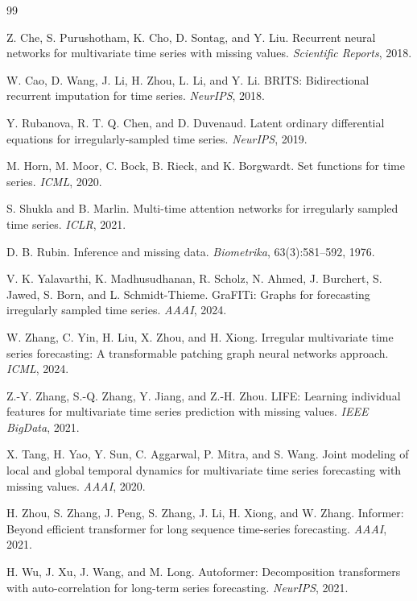 ﻿\documentclass[10pt,conference]{IEEEtran}
\begin{document}
\begin{thebibliography}{99}

Z. Che, S. Purushotham, K. Cho, D. Sontag, and Y. Liu.
Recurrent neural networks for multivariate time series with missing values.
\emph{Scientific Reports}, 2018.

W. Cao, D. Wang, J. Li, H. Zhou, L. Li, and Y. Li.
BRITS: Bidirectional recurrent imputation for time series.
\emph{NeurIPS}, 2018.

Y. Rubanova, R. T. Q. Chen, and D. Duvenaud.
Latent ordinary differential equations for irregularly-sampled time series.
\emph{NeurIPS}, 2019.

M. Horn, M. Moor, C. Bock, B. Rieck, and K. Borgwardt.
Set functions for time series.
\emph{ICML}, 2020.

S. Shukla and B. Marlin.
Multi-time attention networks for irregularly sampled time series.
\emph{ICLR}, 2021.

D. B. Rubin.
Inference and missing data.
\emph{Biometrika}, 63(3):581--592, 1976.

V. K. Yalavarthi, K. Madhusudhanan, R. Scholz, N. Ahmed, J. Burchert,
S. Jawed, S. Born, and L. Schmidt-Thieme.
GraFITi: Graphs for forecasting irregularly sampled time series.
\emph{AAAI}, 2024.

W. Zhang, C. Yin, H. Liu, X. Zhou, and H. Xiong.
Irregular multivariate time series forecasting: A transformable patching graph
neural networks approach.
\emph{ICML}, 2024.

Z.-Y. Zhang, S.-Q. Zhang, Y. Jiang, and Z.-H. Zhou.
LIFE: Learning individual features for multivariate time series prediction
with missing values.
\emph{IEEE BigData}, 2021.

X. Tang, H. Yao, Y. Sun, C. Aggarwal, P. Mitra, and S. Wang.
Joint modeling of local and global temporal dynamics for multivariate time
series forecasting with missing values.
\emph{AAAI}, 2020.

H. Zhou, S. Zhang, J. Peng, S. Zhang, J. Li, H. Xiong, and W. Zhang.
Informer: Beyond efficient transformer for long sequence time-series
forecasting.
\emph{AAAI}, 2021.

H. Wu, J. Xu, J. Wang, and M. Long.
Autoformer: Decomposition transformers with auto-correlation for long-term
series forecasting.
\emph{NeurIPS}, 2021.


\end{thebibliography}
\end{document}
